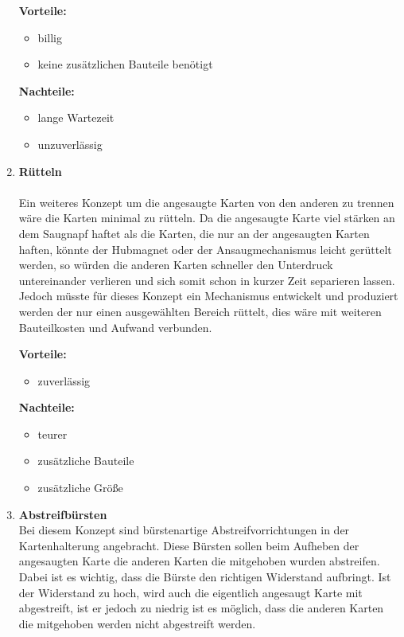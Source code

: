 \begin{enumerate}
    \textbf{Vorteile:}
    \begin{itemize}
        \item billig
        \item keine zusätzlichen Bauteile benötigt
    \end{itemize}
    \textbf{Nachteile:}
    \begin{itemize}
        \item lange Wartezeit
        \item unzuverlässig
    \end{itemize}

    \item \textbf{Rütteln}\\\\
    Ein weiteres Konzept um die angesaugte Karten von den anderen zu trennen wäre die Karten minimal zu rütteln.
    Da die angesaugte Karte viel stärken an dem Saugnapf haftet als die Karten, die nur an der angesaugten Karten haften,
    könnte der Hubmagnet oder der Ansaugmechanismus leicht gerüttelt werden, so würden die anderen Karten schneller den
    Unterdruck untereinander verlieren und sich somit schon in kurzer Zeit separieren lassen. Jedoch müsste für dieses Konzept
    ein Mechanismus entwickelt und produziert werden der nur einen ausgewählten Bereich rüttelt, dies wäre mit weiteren Bauteilkosten und
    Aufwand verbunden.

    \textbf{Vorteile:}
    \begin{itemize}
        \item zuverlässig
    \end{itemize}
    \textbf{Nachteile:}
    \begin{itemize}
        \item teurer
        \item zusätzliche Bauteile
        \item zusätzliche Größe
    \end{itemize}



    \item \textbf{Abstreifbürsten}\\
    Bei diesem Konzept sind bürstenartige Abstreifvorrichtungen in der Kartenhalterung angebracht. Diese Bürsten sollen beim Aufheben der
    angesaugten Karte die anderen Karten die mitgehoben wurden abstreifen. Dabei ist es wichtig, dass die Bürste den richtigen Widerstand aufbringt.
    Ist der Widerstand zu hoch, wird auch die eigentlich angesaugt Karte mit abgestreift, ist er jedoch zu niedrig ist es möglich, dass die anderen Karten
    die mitgehoben werden nicht abgestreift werden.


\end{enumerate}
